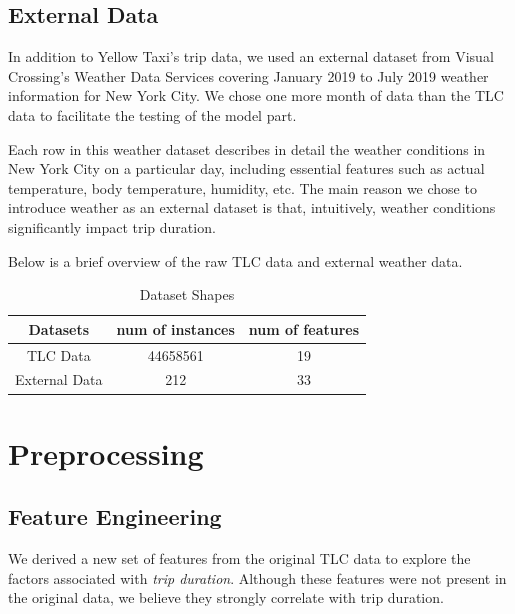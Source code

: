 \documentclass[11pt]{article}
\begin{document}
\subsection{External Data}
In addition to Yellow Taxi's trip data, we used an external dataset from Visual Crossing's Weather Data Services covering January 2019 to July 2019 weather information for New York City\cite{external_data}. We chose one more month of data than the TLC data to facilitate the testing of the model part.

Each row in this weather dataset describes in detail the weather conditions in New York City on a particular day, including essential features such as actual temperature, body temperature, humidity, etc. The main reason we chose to introduce weather as an external dataset is that, intuitively, weather conditions significantly impact trip duration.

Below is a brief overview of the raw TLC data and external weather data.

\begin{table}[h]
\centering
\begin{tabular}{|c|c|c|}
\hline
\textbf{Datasets} & \textbf{num of instances} & \textbf{num of features} \\ 
\hline
TLC Data & 44658561 & 19 \\ 
\hline
External Data & 212 & 33 \\ 
\hline
\end{tabular}
\vspace{-5pt}
\caption{Dataset Shapes} 
\label{tab:dataset_description} %
\end{table}

\section{Preprocessing}
\subsection{Feature Engineering}
We derived a new set of features from the original TLC data to explore the factors associated with \textit{trip duration}. Although these features were not present in the original data, we believe they strongly correlate with trip duration.
\end{document}
